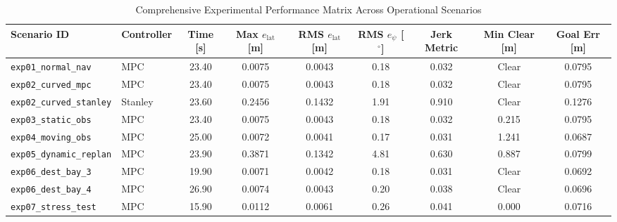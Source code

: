 ﻿%

\begin{table}[t]
\centering
\caption{Comprehensive Experimental Performance Matrix Across Operational Scenarios}
\label{tab:steadypath_overall_metrics}
\renewcommand{\arraystretch}{1.2}
\begin{tabular}{llccccccc}
\hline\hline
\textbf{Scenario ID} & \textbf{Controller} & \textbf{Time [s]} & \textbf{Max $e_{\text{lat}}$ [m]} & \textbf{RMS $e_{\text{lat}}$ [m]} & \textbf{RMS $e_{\psi}$ [$^\circ$]} & \textbf{Jerk Metric} & \textbf{Min Clear [m]} & \textbf{Goal Err [m]} \\
\hline
\texttt{exp01\_normal\_nav}      & MPC     & 23.40 & 0.0075 & 0.0043 & 0.18 & 0.032 & Clear & 0.0795 \\
\texttt{exp02\_curved\_mpc}      & MPC     & 23.40 & 0.0075 & 0.0043 & 0.18 & 0.032 & Clear & 0.0795 \\
\texttt{exp02\_curved\_stanley}  & Stanley & 23.60 & 0.2456 & 0.1432 & 1.91 & 0.910 & Clear & 0.1276 \\
\texttt{exp03\_static\_obs}      & MPC     & 23.40 & 0.0075 & 0.0043 & 0.18 & 0.032 & 0.215 & 0.0795 \\
\texttt{exp04\_moving\_obs}      & MPC     & 25.00 & 0.0072 & 0.0041 & 0.17 & 0.031 & 1.241 & 0.0687 \\
\texttt{exp05\_dynamic\_replan}  & MPC     & 23.90 & 0.3871 & 0.1342 & 4.81 & 0.630 & 0.887 & 0.0799 \\
\texttt{exp06\_dest\_bay\_3}     & MPC     & 19.90 & 0.0071 & 0.0042 & 0.18 & 0.031 & Clear & 0.0692 \\
\texttt{exp06\_dest\_bay\_4}     & MPC     & 26.90 & 0.0074 & 0.0043 & 0.20 & 0.038 & Clear & 0.0696 \\
\texttt{exp07\_stress\_test}     & MPC     & 15.90 & 0.0112 & 0.0061 & 0.26 & 0.041 & 0.000 & 0.0716 \\
\hline\hline
\end{tabular}
\end{table}

